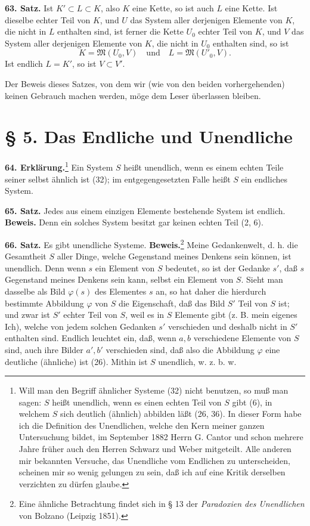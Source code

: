 \documentclass[11pt]{article}
\newcommand{\Mf}{\mathfrak{M}}
\newcommand{\partof}{\mathrel{\subset}}
\begin{document}
\noindent\textbf{63. Satz.} Ist $K'\partof L\partof K$, also $K$ eine Kette, so ist auch $L$ eine Kette. Ist dieselbe echter Teil von $K$, und $U$ das System aller derjenigen Elemente von $K$, die nicht in $L$ enthalten sind, ist ferner die Kette $U_0$ echter Teil von $K$, und $V$ das System aller derjenigen Elemente von $K$, die nicht in $U_0$ enthalten sind, so ist
\[
K=\Mf(U_0,V)\quad\text{und}\quad L=\Mf(U'_0,V).
\]
Ist endlich $L=K'$, so ist $V\partof V'$.

Der Beweis dieses Satzes, von dem wir (wie von den beiden vorhergehenden) keinen Gebrauch machen werden, möge dem Leser überlassen bleiben.

\section*{§ 5. Das Endliche und Unendliche}

\noindent\textbf{64. Erklärung.}\footnote{Will man den Begriff ähnlicher Systeme (32) nicht benutzen, so muß man sagen: $S$ heißt unendlich, wenn es einen echten Teil von $S$ gibt (6), in welchem $S$ sich deutlich (ähnlich) abbilden läßt (26, 36). In dieser Form habe ich die Definition des Unendlichen, welche den Kern meiner ganzen Untersuchung bildet, im September 1882 Herrn G. Cantor und schon mehrere Jahre früher auch den Herren Schwarz und Weber mitgeteilt. Alle anderen mir bekannten Versuche, das Unendliche vom Endlichen zu unterscheiden, scheinen mir so wenig gelungen zu sein, daß ich auf eine Kritik derselben verzichten zu dürfen glaube.} Ein System $S$ heißt unendlich, wenn es einem echten Teile seiner selbst ähnlich ist (32); im entgegengesetzten Falle heißt $S$ ein endliches System.

\noindent\textbf{65. Satz.} Jedes aus einem einzigen Elemente bestehende System ist endlich. \textbf{Beweis.} Denn ein solches System besitzt gar keinen echten Teil (2, 6).

\noindent\textbf{66. Satz.} Es gibt unendliche Systeme. \textbf{Beweis.}\footnote{Eine ähnliche Betrachtung findet sich in § 13 der \emph{Paradoxien des Unendlichen} von Bolzano (Leipzig 1851).} Meine Gedankenwelt, d. h. die Gesamtheit $S$ aller Dinge, welche Gegenstand meines Denkens sein können, ist unendlich. Denn wenn $s$ ein Element von $S$ bedeutet, so ist der Gedanke $s'$, daß $s$ Gegenstand meines Denkens sein kann, selbst ein Element von $S$. Sieht man dasselbe als Bild $\varphi(s)$ des Elementes $s$ an, so hat daher die hierdurch bestimmte Abbildung $\varphi$ von $S$ die Eigenschaft, daß das Bild $S'$ Teil von $S$ ist; und zwar ist $S'$ echter Teil von $S$, weil es in $S$ Elemente gibt (z. B. mein eigenes Ich), welche von jedem solchen Gedanken $s'$ verschieden und deshalb nicht in $S'$ enthalten sind. Endlich leuchtet ein, daß, wenn $a,b$ verschiedene Elemente von $S$ sind, auch ihre Bilder $a',b'$ verschieden sind, daß also die Abbildung $\varphi$ eine deutliche (ähnliche) ist (26). Mithin ist $S$ unendlich, w. z. b. w.
\end{document}
